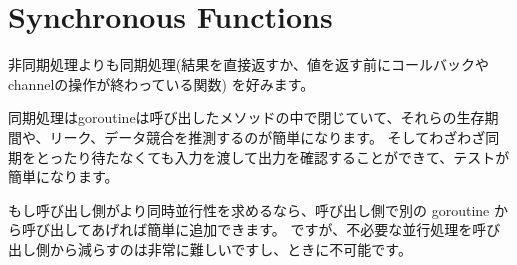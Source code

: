 \section{Synchronous Functions}

非同期処理よりも同期処理(結果を直接返すか、値を返す前にコールバックやchannelの操作が終わっている関数) を好みます。

同期処理はgoroutineは呼び出したメソッドの中で閉じていて、それらの生存期間や、リーク、データ競合を推測するのが簡単になります。 そしてわざわざ同期をとったり待たなくても入力を渡して出力を確認することができて、テストが簡単になります。

もし呼び出し側がより同時並行性を求めるなら、呼び出し側で別の goroutine から呼び出してあげれば簡単に追加できます。 ですが、不必要な並行処理を呼び出し側から減らすのは非常に難しいですし、ときに不可能です。

